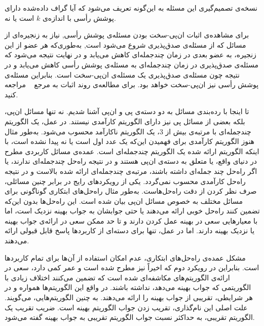 نسخه‌ی تصمیم‌گیری این مسئله به این‌گونه تعریف می‌شود که آیا گراف داده‌شده دارای پوشش رأسی با اندازه‌ی $k$ است یا نه.



برای مشاهده‌ی اثبات ان‌پی-سخت بودن مسئله‌ی پوشش رأسی, نیاز به زنجیره‌ای از مسائل که از مسئله‌ی صدق‌پذیری شروع می‌شود است, به‌طوری‌که هر عضو از این زنجیره، به عضو بعدی در زمان چندجمله‌ای کاهش می‌یابد و در نهایت نتیجه می‌شود که مسئله‌ی صدق‌پذیری در زمان چندجمله‌ای به مسئله‌ی پوشش رأسی کاهش می‌یابد و در نتیجه چون مسئله‌ی صدق‌پذیری یک مسئله‌ی ان‌پی-سخت است.
بنابراین مسئله‌ی پوشش رأسی نیز ان‌پی-سخت خواهد بود. برای مطالعه‌ی روند اثبات به مرجع ~ مراجعه کنید. 



تا اینجا با رده‌بندی مسائل به دو دسته‌ی پی و ان‌پی آشنا شدیم.
نه تنها مسائل ان‌پی، بلکه بعضی از مسائل پی نیز دارای الگوریتم کارآمدی نیستند.
در عمل، یک الگوریتم چندجمله‌ای با مرتبه‌ی بیش از $3$، یک الگوریتم ناکارآمد محسوب می‌شود.
به‌طور مثال هنوز الگوریتم کارآمدی برای فهمیدن این‌که یک عدد اول است یا نه پیدا نشده است، با اینکه الگوریتم ارائه شده یک الگوریتم چندجمله‌ای است.
عمده‌ی مسائل کاربردی مطرح در دنیای واقع، یا متعلق به دسته‌ی ان‌پی هستند و در نتیجه راه‌حل چندجمله‌ای ندارند، یا اگر راه‌حل چند جمله‌ای داشته باشند، مرتبه‌ی چندجمله‌ای ارائه شده بالاست و در نتیجه راه‌حل کارآمدی محسوب نمی‌گردد.
یکی از رویکردهای رایج در برابر چنین مسائلی، صرف نظر کردن از دقت راه‌حل‌هاست.
به‌طور مثال راه‌حل‌های ابتکاری گوناگونی برای مسائل مختلف به خصوص مسائل ان‌پی بیان شده است.
این راه‌حل‌ها بدون این‌که تضمین کنند راه‌حل خوبی ارائه می‌دهند یا حتی جوابشان به جواب بهینه نزدیک است، اما با معیارهایی سعی در بهینه عمل کردن دارند و تا حد ممکن سعی در ارائه‌ی جواب بهینه یا نزدیک بهینه دارند.
اما در عمل، تنها برای دسته‌ای از کاربردها پاسخ قابل قبولی ارائه می‌دهند. 

مشکل عمده‌ی راه‌حل‌های ابتکاری، عدم امکان استفاده از آن‌ها برای تمام کاربردها است.
بنابراین در رویکرد دوم که اخیراً نیز مطرح شده است و عمر کمی دارد، سعی در ارائه‌ی الگوریتم‌های مکاشفه‌ای شده است که تضمین می‌کنند اختلاف زیادی با الگوریتمی که جواب بهینه می‌دهد، نداشته باشند.
در واقع این الگوریتم‌ها همواره و در هر شرایطی، تقریبی از جواب بهینه را ارائه می‌دهند.
به چنین الگوریتم‌هایی،  می‌گویند.
علت اصلی این نام‌گذاری، تقریب زدن جواب الگوریتم بهینه است.
ضریب تقریب یک الگوریتم تقریبی، به حداکثر نسبت جواب الگوریتم تقریبی به جواب بهینه گفته می‌شود.

